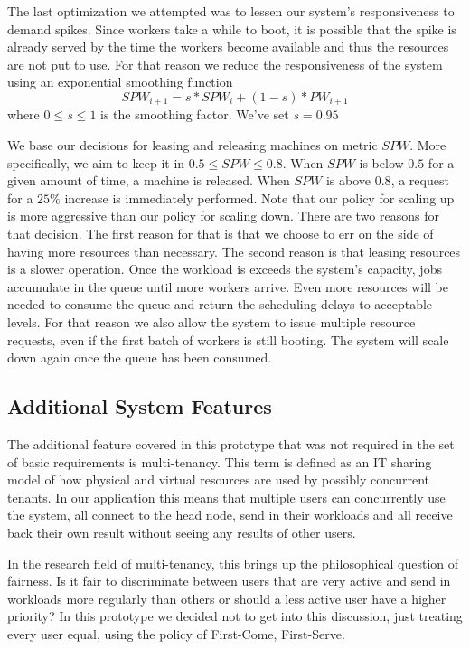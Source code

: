 \documentclass{stylesheet}
\begin{document}
The last optimization we attempted was to lessen our system's responsiveness to demand spikes. Since workers take a while to boot, it is possible that the spike is already served by the time the workers become available and thus the resources are not put to use. For that reason we reduce the responsiveness of the system using an exponential smoothing function
$$SPW_{i+1} = s*SPW_{i} + (1-s)*PW_{i+1}$$ where $0 \leq s \leq 1$ is the smoothing factor. We've set $s=0.95$

We base our decisions for leasing and releasing machines on metric $SPW$. More specifically, we aim to keep it in $0.5 \leq SPW \leq 0.8$. When $SPW$ is below $0.5$ for a given amount of time, a machine is released. When $SPW$ is above $0.8$, a request for a $25\%$ increase is immediately performed. Note that our policy for scaling up is more aggressive than our policy for scaling down. There are two reasons for that decision. The first reason for that is that we choose to err on the side of having more resources than necessary. The second reason is that leasing resources is a slower operation. Once the workload is exceeds the system's capacity, jobs accumulate in the queue until more workers arrive. Even more resources will be needed to consume the queue and return the scheduling delays to acceptable levels. For that reason we also allow the system to issue multiple resource requests, even if the first batch of workers is still booting. The system will scale down again once the queue has been consumed.

\subsection{Additional System Features}
\label{subsec:additionalFeatures}
The additional feature covered in this prototype that was not required in the set of basic requirements is multi-tenancy. This term is defined as an IT sharing model of how physical and virtual resources are used by possibly concurrent tenants. In our application this means that multiple users can concurrently use the system, all connect to the head node, send in their workloads and all receive back their own result without seeing any results of other users.

In the research field of multi-tenancy, this brings up the philosophical question of fairness. Is it fair to discriminate between users that are very active and send in workloads more regularly than others or should a less active user have a higher priority? In this prototype we decided not to get into this discussion, just treating every user equal, using the policy of First-Come, First-Serve.
\end{document}
